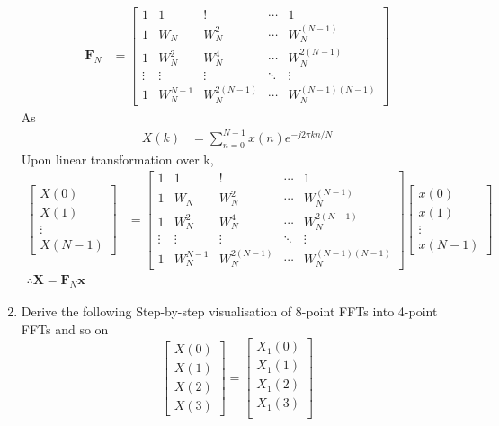 \documentclass[journal,12pt,twocolumn]{IEEEtran}
\let\vec\mathbf
\numberwithin{equation}{section}
\renewcommand\thesection{\arabic{section}}
\begin{document}
\begin{enumerate}[label=\arabic*.,ref=\thesection.\theenumi]
\begin{align}
\vec{F}_N &=\begin{bmatrix}
1&1&!&\cdots&1\\1&W_N&W^2_N&\cdots&W_N^{(N-1)}\\1&W_N^2&W_N^4&\cdots&W^{2(N-1)}_N\\\vdots&\vdots&\vdots&\ddots&\vdots\\1&W_N^{N-1}&W_N^{2(N-1)}&\cdots&W_N^{(N-1)(N-1)}
\end{bmatrix}
\end{align}
As \begin{align} 
X(k)&=\sum_{n=0}^{N-1} x(n) e^{-j 2 \pi k n /N}
\end{align}
Upon linear transformation over k,
\begin{align}
\begin{bmatrix}
X(0)\\X(1)\\ \vdots\\ X(N-1)
\end{bmatrix}
&=\begin{bmatrix}
1&1&!&\cdots&1\\1&W_N&W^2_N&\cdots&W_N^{(N-1)}\\1&W_N^2&W_N^4&\cdots&W^{2(N-1)}_N\\\vdots&\vdots&\vdots&\ddots&\vdots\\1&W_N^{N-1}&W_N^{2(N-1)}&\cdots&W_N^{(N-1)(N-1)}
\end{bmatrix}\begin{bmatrix}
x(0)\\x(1)\\\vdots\\ x(N-1)
\end{bmatrix}\\
\therefore \vec{X} = \vec{F}_N \vec{x}
\end{align}
\item Derive the following Step-by-step visualisation  of
8-point FFTs into 4-point FFTs and so on
\begin{equation}
\begin{bmatrix}
X(0) \\ 
X(1) \\ 
X(2) \\ 
X(3)
\end{bmatrix}
=
\begin{bmatrix}
X_{1}(0) \\ 
X_{1}(1)\\ 
X_{1}(2)\\
X_{1}(3)\\
\end{bmatrix}

\end{equation}
\end{enumerate}
\end{document}
